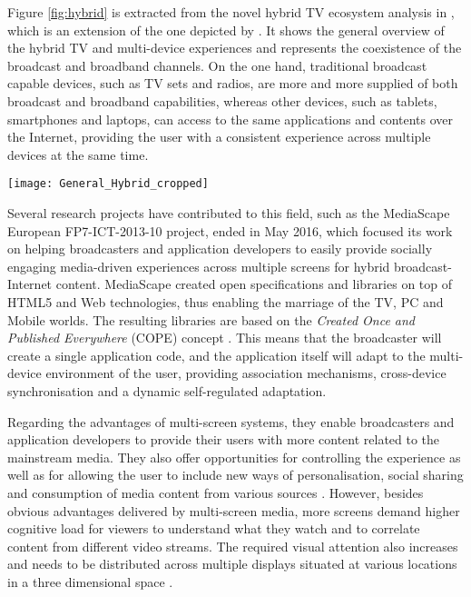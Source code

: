 Figure \ref{fig:hybrid} is extracted from the novel hybrid TV ecosystem analysis in \cite{thesisMikel}, which is an extension of the one depicted by \cite{Claudy2012}. It shows the general overview of the hybrid TV and multi-device experiences and represents the coexistence of the broadcast and broadband channels. On the one hand, traditional broadcast capable devices, such as TV sets and radios, are more and more supplied of both broadcast and broadband capabilities, whereas other devices, such as tablets, smartphones and laptops, can access to the same applications and contents over the Internet, providing the user with a consistent experience across multiple devices at the same time. 


\begin{figure*}
	\centering
	\texttt{[image: General\_Hybrid\_cropped]}
	\caption{General overview of the Hybrid TV and multi-device experiences \cite{Zorrilla2015}}
	\label{fig:hybrid}
\end{figure*} 
%
Several research projects have contributed to this field, such as the MediaScape \cite{MediascapeWeb} European FP7-ICT-2013-10 project, ended in May 2016, which focused its work on helping broadcasters and application developers to easily provide socially engaging media-driven experiences across multiple screens for hybrid broadcast-Internet content. MediaScape created open specifications and libraries on top of HTML5 and Web technologies, thus enabling the marriage of the TV, PC and Mobile worlds. The resulting libraries are based on the \textit{Created Once and Published Everywhere} (COPE) concept \cite{nem}. This means that the broadcaster will create a single application code, and the application itself will adapt to the multi-device environment of the user, providing association mechanisms, cross-device synchronisation and a dynamic self-regulated adaptation. 

Regarding the advantages of multi-screen systems, they enable broadcasters and application developers to provide their users with more content related to the mainstream media. They also offer opportunities for controlling the experience as well as for allowing the user to include new ways of personalisation, social sharing and consumption of media content from various sources \cite{cesar2008usages}. However, besides obvious advantages delivered by multi-screen media, more screens demand higher cognitive load for viewers to understand what they watch and to correlate content from different video streams. The required visual attention also increases and needs to be distributed across multiple displays situated at various locations in a three dimensional space \cite{vatavu2015evaluating}.

